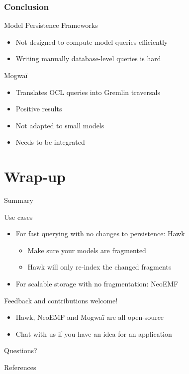 \documentclass[10pt]{beamer}
\begin{document}
\begin{frame}[c]
\end{frame}

\begin{frame}[c]\frametitle{Conclusion}
	\begin{block}{Model Persistence Frameworks}
	\begin{itemize}
		\item Not designed to compute model queries efficiently
		\item Writing manually database-level queries is hard
	\end{itemize}
	\end{block}

\begin{block}{Mogwaï}
		\begin{itemize}
		\item Translates OCL queries into Gremlin traversals
		\item Positive results
		\item Not adapted to small models
		\item Needs to be integrated
	\end{itemize}
\end{block}
\end{frame}


\section{Wrap-up}

\begin{frame}{Summary}

  \begin{block}{Use cases}
    \begin{itemize}
    \item For fast querying with no changes to persistence: Hawk
    \begin{itemize}
    \item Make sure your models are fragmented
    \item Hawk will only re-index the changed fragments
    \end{itemize}
    \item For scalable storage with no fragmentation: NeoEMF
    \end{itemize}
  \end{block}

  \begin{block}{Feedback and contributions welcome!}
  \begin{itemize}
  \item Hawk, NeoEMF and Mogwaï are all open-source
  \item Chat with us if you have an idea for an application
  \end{itemize}
  \end{block}

\end{frame}

\appendix

{
\begin{frame}[standout]
  Questions?
\end{frame}
}

\begin{frame}[allowframebreaks]{References}

  
  

\end{frame}
\end{document}

